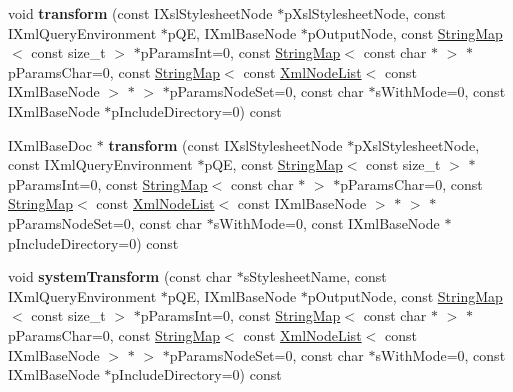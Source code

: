 \begin{DoxyCompactItemize}
\item 
\hypertarget{classgeneral__server_1_1DatabaseNode_ad9037cc4160f05cd1c06d8eeefa82cc2}{void {\bfseries transform} (const \-I\-Xsl\-Stylesheet\-Node $\ast$p\-Xsl\-Stylesheet\-Node, const \-I\-Xml\-Query\-Environment $\ast$p\-Q\-E, \-I\-Xml\-Base\-Node $\ast$p\-Output\-Node, const \hyperlink{classgeneral__server_1_1StringMap}{\-String\-Map}$<$ const size\-\_\-t $>$ $\ast$p\-Params\-Int=0, const \hyperlink{classgeneral__server_1_1StringMap}{\-String\-Map}$<$ const char $\ast$ $>$ $\ast$p\-Params\-Char=0, const \hyperlink{classgeneral__server_1_1StringMap}{\-String\-Map}$<$ const \hyperlink{classgeneral__server_1_1XmlNodeList}{\-Xml\-Node\-List}$<$ const \-I\-Xml\-Base\-Node $>$ $\ast$ $>$ $\ast$p\-Params\-Node\-Set=0, const char $\ast$s\-With\-Mode=0, const \-I\-Xml\-Base\-Node $\ast$p\-Include\-Directory=0) const }\label{classgeneral__server_1_1DatabaseNode_ad9037cc4160f05cd1c06d8eeefa82cc2}

\item 
\hypertarget{classgeneral__server_1_1DatabaseNode_afd2b1f16872a63b7cd602077c9144562}{\-I\-Xml\-Base\-Doc $\ast$ {\bfseries transform} (const \-I\-Xsl\-Stylesheet\-Node $\ast$p\-Xsl\-Stylesheet\-Node, const \-I\-Xml\-Query\-Environment $\ast$p\-Q\-E, const \hyperlink{classgeneral__server_1_1StringMap}{\-String\-Map}$<$ const size\-\_\-t $>$ $\ast$p\-Params\-Int=0, const \hyperlink{classgeneral__server_1_1StringMap}{\-String\-Map}$<$ const char $\ast$ $>$ $\ast$p\-Params\-Char=0, const \hyperlink{classgeneral__server_1_1StringMap}{\-String\-Map}$<$ const \hyperlink{classgeneral__server_1_1XmlNodeList}{\-Xml\-Node\-List}$<$ const \-I\-Xml\-Base\-Node $>$ $\ast$ $>$ $\ast$p\-Params\-Node\-Set=0, const char $\ast$s\-With\-Mode=0, const \-I\-Xml\-Base\-Node $\ast$p\-Include\-Directory=0) const }\label{classgeneral__server_1_1DatabaseNode_afd2b1f16872a63b7cd602077c9144562}

\item 
\hypertarget{classgeneral__server_1_1DatabaseNode_af6ef3471a9a989e113aa654c0f5ecd14}{void {\bfseries system\-Transform} (const char $\ast$s\-Stylesheet\-Name, const \-I\-Xml\-Query\-Environment $\ast$p\-Q\-E, \-I\-Xml\-Base\-Node $\ast$p\-Output\-Node, const \hyperlink{classgeneral__server_1_1StringMap}{\-String\-Map}$<$ const size\-\_\-t $>$ $\ast$p\-Params\-Int=0, const \hyperlink{classgeneral__server_1_1StringMap}{\-String\-Map}$<$ const char $\ast$ $>$ $\ast$p\-Params\-Char=0, const \hyperlink{classgeneral__server_1_1StringMap}{\-String\-Map}$<$ const \hyperlink{classgeneral__server_1_1XmlNodeList}{\-Xml\-Node\-List}$<$ const \-I\-Xml\-Base\-Node $>$ $\ast$ $>$ $\ast$p\-Params\-Node\-Set=0, const char $\ast$s\-With\-Mode=0, const \-I\-Xml\-Base\-Node $\ast$p\-Include\-Directory=0) const }\label{classgeneral__server_1_1DatabaseNode_af6ef3471a9a989e113aa654c0f5ecd14}


\end{DoxyCompactItemize}
